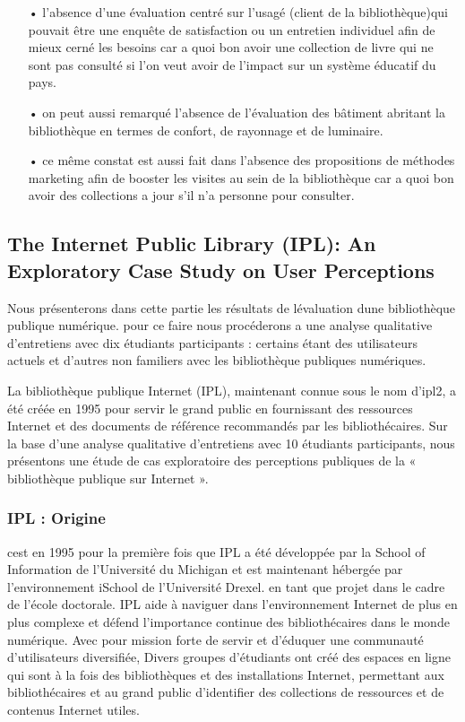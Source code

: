 \documentclass[french,a4paper,12pt]{article}
\begin{document}
\begin{enumerate}
\item[•] l'absence d'une évaluation centré sur l'usagé (client de la bibliothèque)qui pouvait être une enquête de satisfaction ou un entretien individuel afin de mieux cerné les besoins car a quoi bon avoir une collection de livre qui ne sont pas consulté si l'on veut avoir de l'impact sur un système éducatif du pays.
\item[•] on peut aussi remarqué l'absence de l'évaluation des bâtiment abritant la bibliothèque en termes de confort, de rayonnage et de luminaire. 
\item[•] ce même constat est aussi fait dans l'absence des propositions de méthodes marketing afin de booster les visites au sein de la bibliothèque car a quoi bon avoir des collections a jour s'il n'a personne pour consulter.
\end{enumerate} 

\newpage
\subsection{ The Internet Public Library (IPL): An Exploratory Case Study on User Perceptions}

\quad Nous présenterons dans cette partie les résultats de lévaluation dune  bibliothèque publique numérique. pour ce faire nous procéderons a  une analyse qualitative d'entretiens avec dix étudiants participants : certains étant des utilisateurs actuels et d'autres non familiers avec les bibliothèque publiques numériques.

\quad La bibliothèque publique Internet (IPL), maintenant connue sous le nom d'ipl2, a été créée en 1995 pour servir le grand public en fournissant des ressources Internet et des documents de référence recommandés par les bibliothécaires. Sur la base d'une analyse qualitative d'entretiens avec 10 étudiants participants, nous présentons une étude de cas exploratoire des perceptions publiques de la « bibliothèque publique sur Internet ».

\subsubsection{ IPL : Origine}

\quad cest  en 1995 pour la première fois que IPL a été  développée par la School of Information de l'Université du Michigan et est maintenant hébergée par l'environnement iSchool de l'Université Drexel.  en tant que projet dans le cadre de l'école doctorale.  IPL aide à naviguer dans l'environnement Internet de plus en plus complexe et défend l'importance continue des bibliothécaires dans le monde numérique. Avec pour mission forte de servir et d'éduquer une communauté d'utilisateurs diversifiée, Divers groupes d'étudiants ont créé des espaces en ligne qui sont à la fois des bibliothèques et des installations Internet, permettant aux bibliothécaires et au grand public d'identifier des collections de ressources et de contenus Internet utiles. 
\end{document}
